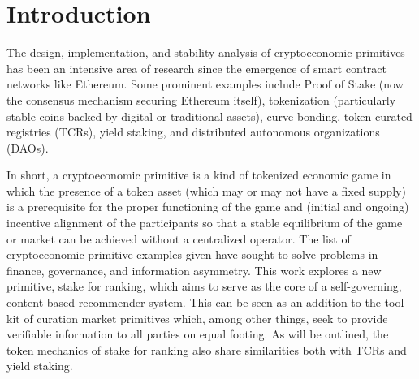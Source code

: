\section{Introduction}

The design, implementation, and stability analysis of cryptoeconomic primitives has been an intensive area of research since the emergence of smart contract networks like Ethereum. Some prominent examples include Proof of Stake (now the consensus mechanism securing Ethereum itself), tokenization (particularly stable coins backed by digital or traditional assets), curve bonding, token curated registries (TCRs), yield staking, and distributed autonomous organizations (DAOs). 

In short, a cryptoeconomic primitive is a kind of tokenized economic game in which the presence of a token asset (which may or may not have a fixed supply) is a prerequisite for the proper functioning of the game and (initial and ongoing) incentive alignment of the participants so that a stable equilibrium of the game or market can be achieved without a centralized operator. The list of cryptoeconomic primitive examples given have sought to solve problems in finance, governance, and information asymmetry. This work explores a new primitive, stake for ranking, which aims to serve as the core of a self-governing, content-based recommender system. This can be seen as an addition to the tool kit of curation market primitives which, among other things, seek to provide verifiable information to all parties on equal footing. As will be outlined, the token mechanics of stake for ranking also share similarities both with TCRs and yield staking. 